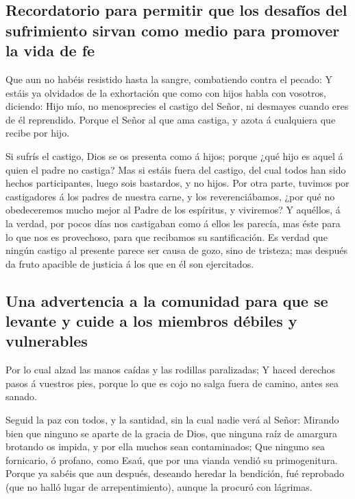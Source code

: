 \hypertarget{recordatorio-para-permitir-que-los-desafuxedos-del-sufrimiento-sirvan-como-medio-para-promover-la-vida-de-fe}{%
\subsection{Recordatorio para permitir que los desafíos del sufrimiento
sirvan como medio para promover la vida de
fe}\label{recordatorio-para-permitir-que-los-desafuxedos-del-sufrimiento-sirvan-como-medio-para-promover-la-vida-de-fe}}

 Que aun no habéis resistido hasta la sangre, combatiendo
contra el pecado:  Y estáis ya olvidados de la exhortación
que como con hijos habla con vosotros, diciendo: Hijo mío, no
menosprecies el castigo del Señor, ni desmayes cuando eres de él
reprendido.  Porque el Señor al que ama castiga, y azota á
cualquiera que recibe por hijo.

 Si sufrís el castigo, Dios se os presenta como á hijos;
porque ¿qué hijo es aquel á quien el padre no castiga? 
Mas si estáis fuera del castigo, del cual todos han sido hechos
participantes, luego sois bastardos, y no hijos.  Por otra
parte, tuvimos por castigadores á los padres de nuestra carne, y los
reverenciábamos, ¿por qué no obedeceremos mucho mejor al Padre de los
espíritus, y viviremos?  Y aquéllos, á la verdad, por
pocos días nos castigaban como á ellos les parecía, mas éste para lo que
nos es provechoso, para que recibamos su santificación. 
Es verdad que ningún castigo al presente parece ser causa de gozo, sino
de tristeza; mas después da fruto apacible de justicia á los que en él
son ejercitados.

\hypertarget{una-advertencia-a-la-comunidad-para-que-se-levante-y-cuide-a-los-miembros-duxe9biles-y-vulnerables}{%
\subsection{Una advertencia a la comunidad para que se levante y cuide a
los miembros débiles y
vulnerables}\label{una-advertencia-a-la-comunidad-para-que-se-levante-y-cuide-a-los-miembros-duxe9biles-y-vulnerables}}

 Por lo cual alzad las manos caídas y las rodillas
paralizadas;  Y haced derechos pasos á vuestros pies,
porque lo que es cojo no salga fuera de camino, antes sea sanado.

 Seguid la paz con todos, y la santidad, sin la cual
nadie verá al Señor:  Mirando bien que ninguno se aparte
de la gracia de Dios, que ninguna raíz de amargura brotando os impida, y
por ella muchos sean contaminados;  Que ninguno sea
fornicario, ó profano, como Esaú, que por una vianda vendió su
primogenitura.  Porque ya sabéis que aun después,
deseando heredar la bendición, fué reprobado (que no halló lugar de
arrepentimiento), aunque la procuró con lágrimas.

